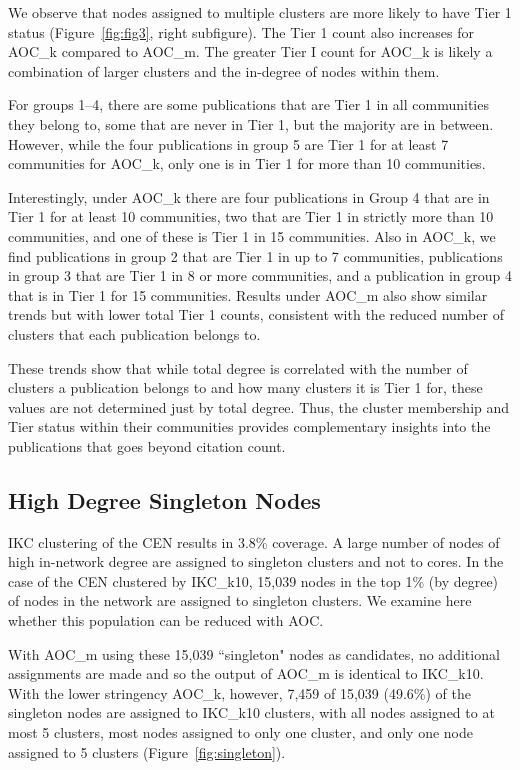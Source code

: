 \documentclass[12pt, oneside]{article}   	%
\begin{document}
We observe that nodes assigned to multiple clusters are more likely to have Tier 1 status (Figure~\ref{fig:fig3}, right subfigure). The Tier 1 count also increases for AOC\_k compared to AOC\_m. The greater Tier I count for AOC\_k is likely a combination of larger clusters and the in-degree of nodes within them.

For groups 1--4, there are some publications that are Tier 1 in all communities they belong to, some that are never in Tier 1, but the majority are in between. 
However, while the four publications in group 5 are Tier 1 for at least 7 communities for AOC\_k, only one is in Tier 1 for more than 10 communities. 

Interestingly, under AOC\_k there are four publications in Group 4 that are in Tier 1 for at least 10 communities, two that are Tier 1 in strictly more than 10 communities, and one of these is Tier 1 in 15 communities. Also in AOC\_k, we find publications in group 2 that are Tier 1 in up to 7 communities, publications in group 3 that are Tier 1 in 8 or more communities, and a publication in group 4 that is in Tier 1 for 15 communities. Results under AOC\_m also show similar trends but with lower total Tier 1 counts, consistent with the reduced number of clusters that each publication belongs to.
	
These trends show that while total degree is correlated with the number of clusters a publication belongs to and how many clusters it is Tier 1 for,
these values are not determined just by total degree. Thus, the cluster membership and Tier status within their communities provides complementary insights into  the publications that goes beyond citation count.
	
\subsection{High Degree Singleton Nodes} 
	
IKC clustering of the CEN results in 3.8\% coverage. A large number of nodes of high in-network degree are assigned to singleton clusters and not to cores. In the case of the CEN clustered by IKC\_k10, 15,039 nodes in the top 1\% (by degree) of nodes in the network are assigned to singleton clusters. We examine here whether this population can be reduced with AOC. 


With AOC\_m using these 15,039  ``singleton" nodes as candidates, no additional assignments are made and so the output of AOC\_m is identical to IKC\_k10. 
With the lower stringency AOC\_k, however, 7,459 of 15,039 (49.6\%) of the singleton nodes are assigned to IKC\_k10 clusters, with all nodes assigned to at most 5 clusters, most nodes assigned to only one cluster, and only one node assigned to 5 clusters (Figure~\ref{fig:singleton}). 
\end{document}
